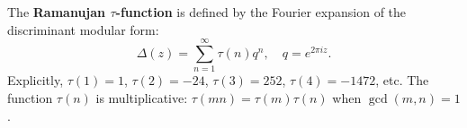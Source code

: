 The \textbf{Ramanujan $\tau$-function} is defined by the Fourier expansion of the discriminant modular form:
$$
\Delta(z) = \sum_{n=1}^\infty \tau(n) q^n, \quad q = e^{2\pi i z}.
$$
Explicitly, $\tau(1) = 1$, $\tau(2) = -24$, $\tau(3) = 252$, $\tau(4) = -1472$, etc. The function $\tau(n)$ is multiplicative: $\tau(mn) = \tau(m)\tau(n)$ when $\gcd(m,n) = 1$.
